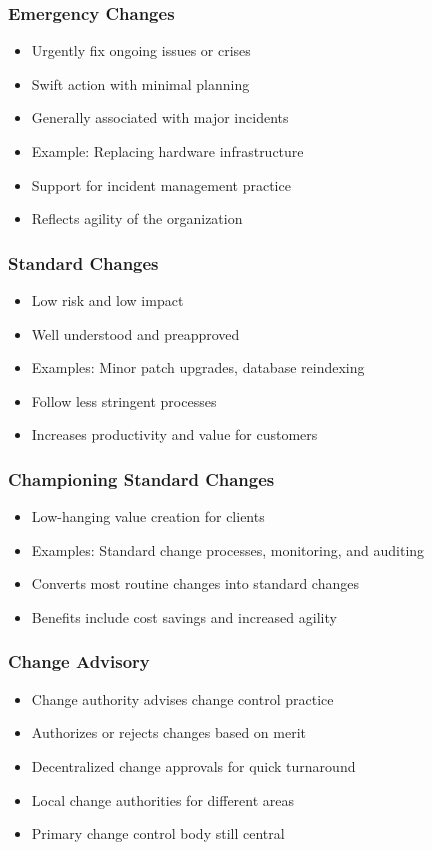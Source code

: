 \documentclass[aspectratio=169, table]{beamer}
\begin{document}
\begin{frame}
	\frametitle{Emergency Changes}
	\begin{itemize}
		\item Urgently fix ongoing issues or crises
		\item Swift action with minimal planning
		\item Generally associated with major incidents
		\item Example: Replacing hardware infrastructure
		\item Support for incident management practice
		\item Reflects agility of the organization
	\end{itemize}
\end{frame}

\begin{frame}
	\frametitle{Standard Changes}
	\begin{itemize}
		\item Low risk and low impact
		\item Well understood and preapproved
		\item Examples: Minor patch upgrades, database reindexing
		\item Follow less stringent processes
		\item Increases productivity and value for customers
	\end{itemize}
\end{frame}

\begin{frame}
	\frametitle{Championing Standard Changes}
	\begin{itemize}
		\item Low-hanging value creation for clients
		\item Examples: Standard change processes, monitoring, and auditing
		\item Converts most routine changes into standard changes
		\item Benefits include cost savings and increased agility
	\end{itemize}
\end{frame}

\begin{frame}
	\frametitle{Change Advisory}
	\begin{itemize}
		\item Change authority advises change control practice
		\item Authorizes or rejects changes based on merit
		\item Decentralized change approvals for quick turnaround
		\item Local change authorities for different areas
		\item Primary change control body still central
	\end{itemize}
\end{frame}
\end{document}
